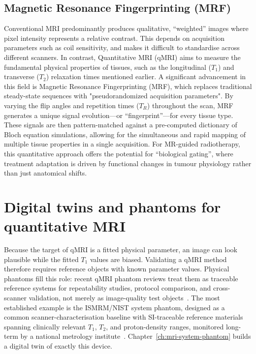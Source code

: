 \subsection{Magnetic Resonance Fingerprinting (MRF)}

Conventional MRI predominantly produces qualitative, ``weighted'' images where pixel intensity represents a relative contrast. This depends on acquisition parameters such as coil sensitivity, and makes it difficult to standardise across different scanners. In contrast, Quantitative MRI (qMRI) aims to measure the fundamental physical properties of tissues, such as the longitudinal ($T_1$) and transverse ($T_2$) relaxation times mentioned earlier. A significant advancement in this field is Magnetic Resonance Fingerprinting (MRF), which replaces traditional steady-state sequences with "pseudorandomized acquisition parameters". By varying the flip angles and repetition times ($T_R$) throughout the scan, MRF generates a unique signal evolution—or ``fingerprint''—for every tissue type. These signals are then pattern-matched against a pre-computed dictionary of Bloch equation simulations, allowing for the simultaneous and rapid mapping of multiple tissue properties in a single acquisition. For MR-guided radiotherapy, this quantitative approach offers the potential for ``biological gating'', where treatment adaptation is driven by functional changes in tumour physiology rather than just anatomical shifts. \cite{mehta_mrf_review:2019} \cite{Jordan_MRF_AUTO:21}


\section{Digital twins and phantoms for quantitative MRI}
\label{sec:bg-twins-phantoms}

Because the target of qMRI is a fitted physical parameter, an image can look
plausible while the fitted $T_1$ values are biased. Validating a qMRI method
therefore requires reference objects with known parameter values. Physical
phantoms fill this role: recent qMRI phantom reviews treat them as traceable
reference systems for repeatability studies, protocol comparison, and
cross-scanner validation, not merely as image-quality test
objects~\cite{keenan_phantoms_2024}. The most established example is the
ISMRM/NIST system phantom, designed as a common scanner-characterisation
baseline with SI-traceable reference materials spanning clinically relevant
$T_1$, $T_2$, and proton-density ranges, monitored long-term by a national
metrology institute~\cite{russek_system_phantom_characterization_2020}.
Chapter~\ref{ch:mri-system-phantom} builds a digital twin of exactly this
device.

